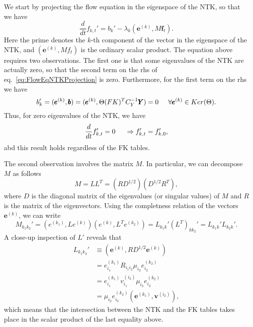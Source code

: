 \documentclass[11pt]{article}
\begin{document}
We start by projecting the flow equation in the eigenspace of the NTK, so that
we have
\begin{equation}
  \frac{d}{dt}f_{k,t}' = b_k' - \lambda_k (\pmb{e}^{(k)}, M \pmb{f}_t).
  \label{eq:FlowEqNTKProjection}
\end{equation}
Here the prime denotes the $k$-th component of the vector in the eigenspace of
the NTK, and $(\pmb{e}^{(k)}, M f_t)$ is the ordinary scalar product. The equation above
requires two observations. The first one is that some eigenvalues of the NTK are
actually zero, so that the second term on the rhs of
eq.~\eqref{eq:FlowEqNTKProjection} is zero. Furthermore, for the first term on
the rhs we have
\begin{equation}
  b_k' = (\pmb{e}^{(k)}, \pmb{b}) = (\pmb{e}^{(k)}, \Theta (FK)^T C_Y^{-1} \pmb{Y}) = 0 \hspace{5mm} \forall \pmb{e}^{(k)} \in Ker(\Theta) .
\end{equation}
Thus, for zero eigenvalues of the NTK, we have
\begin{equation}
  \frac{d}{dt} f_{k,t}' = 0 \hspace{5mm} \Rightarrow f_{k,t}' = f_{k,0}' ,
\end{equation}
abd this result holds regardless of the FK tables.

The second observation involves the matrix $M$. In particular, we can decompose
$M$ as follows
\begin{equation}
  M = LL^T = (RD^{1/2})(D^{1/2}R^T),
\end{equation}
where $D$ is the diagonal matrix of the eigenvalues (or singular values) of $M$
and $R$ is the matrix of the eigenvectors. Using the completness relation of the
vectors $\pmb{e}^{(k)}$, we can write
\begin{equation}
  M_{k_1 k_2}' = (e^{(k_1)}, L e^{(k)})(e^{(k)}, L^T e^{(k_2)}) = L_{k_1k}' (L^T)_{kk_2}' = L_{k_1k}' L_{k_2k}'.
  \label{eq:MProjNTK}
\end{equation}
A close-up inspection of $L'$ reveals that
\begin{equation}
  \begin{split}
    L_{k_1k_2}' & \equiv \left( \pmb{e}^{(k)}, RD^{1/2} \pmb{e}^{(k)} \right) \\
    & = e^{(k_1)}_{i_1} R_{i_1 i_2} \mu_{i_2} e_{i_2}^{(k_2)} \\
    & = e^{(k_1)}_{i_1} v^{(i_2)}_{i_1} \mu_{i_2} e_{i_2}^{(k_2)} \\
    & = \mu_{i_2} e_{i_2}^{(k_2)} (\pmb{e}^{(k_1)}, \pmb{v}^{(i_2)}),
  \end{split}
\end{equation}
which means that the intersection between the NTK and the FK tables takes place in the
scalar product of the last equality above.
\end{document}
